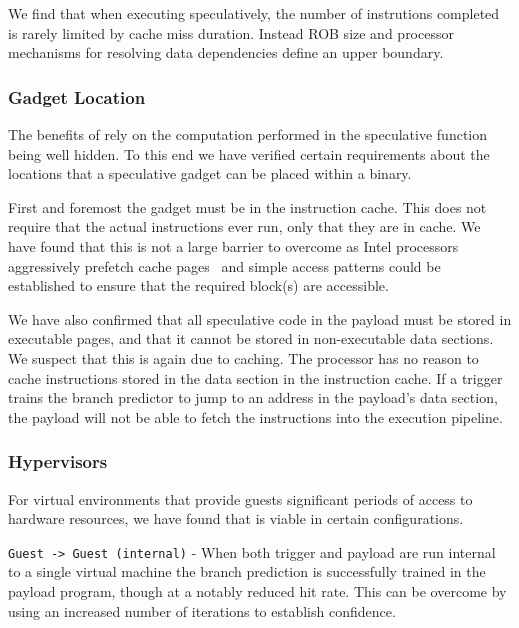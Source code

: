 \medskip

We find that when executing speculatively, the number of instrutions completed
is rarely limited by cache miss duration. Instead
ROB size and processor mechanisms for resolving
data dependencies define an upper boundary.


\subsubsection{Gadget Location}
The benefits of \speculake rely on the computation performed in the
speculative function being well hidden. To this end we have verified 
certain requirements about the locations that a speculative gadget can 
be placed within a binary. 

First and foremost the gadget must be in the instruction cache. 
This does not require that the actual instructions ever run,
 only that they are in cache. We have 
found that this is not a large barrier to overcome as Intel 
processors aggressively prefetch cache pages~\cite{measuring-cache}
and simple access patterns could be established to ensure
that the required block(s) are accessible. 

We have also confirmed that all speculative code in the payload must be
stored in executable pages, and that it cannot be stored in non-executable data
sections. We suspect that this is again due to caching. The processor has no
reason to cache instructions stored in the data section in the instruction
cache. If a trigger trains the branch predictor to jump to an address in the
payload's data section, the payload will not be able to fetch the instructions
into the execution pipeline. 


\subsubsection{Hypervisors}
For virtual environments that provide guests significant periods of access to 
hardware resources, we have found that \speculake is viable in certain configurations. 

\texttt{Guest -> Guest (internal)} - When both trigger and payload are run internal to
a single virtual machine the branch prediction is successfully trained in the payload
program, though at a notably reduced hit rate. This can be overcome by using an 
increased number of iterations to establish confidence. 

